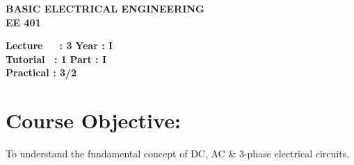 \begin{center}
    \textbf{\huge{\uppercase{Basic Electrical Engineering}}}
    \\
    \vspace{.5cm}
    \textbf{\large{EE 401}}
\end{center}

\noindent\textbf{Lecture\ \ \ : 3} \hfill \textbf{Year : I } \\
\textbf{Tutorial \ : 1} \hfill \textbf{Part : I } \\
\textbf{Practical : 3/2}  \\

\par
\noindent 
\section*{Course Objective:}
To understand the fundamental concept of DC, AC \& 3-phase electrical circuits.

